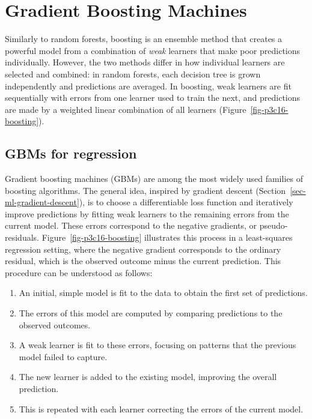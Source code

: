 \documentclass[
  letterpaper,
  krantz2]{style/krantz}
\providecommand{\tightlist}{%
  \setlength{\itemsep}{0pt}\setlength{\parskip}{0pt}}
\begin{document}
\chapter{Gradient Boosting Machines}\label{sec-boost}

Similarly to random forests, boosting is an
ensemble method that creates a powerful model from a combination of
\emph{weak} learners that make poor predictions
individually.
However, the two methods differ in how individual learners are selected
and combined: in random forests, each decision tree is grown
independently and predictions are averaged. In boosting, weak learners
are fit sequentially with errors from one learner used to train the
next, and predictions are made by a weighted linear combination of all
learners (Figure~\ref{fig-p3c16-boosting}).

\section{GBMs for regression}\label{sec-surv-ml-models-boost-regr}

Gradient boosting machines (GBMs) are among the most widely used
families of boosting algorithms. The general idea, inspired by gradient
descent (Section~\ref{sec-ml-gradient-descent}), is to choose a
differentiable loss function and iteratively improve predictions by
fitting weak learners to the remaining errors from the current model.
These errors correspond to the negative gradients, or
pseudo-residuals.
Figure~\ref{fig-p3c16-boosting} illustrates this process in a
least-squares regression setting, where the negative gradient
corresponds to the ordinary residual, which is the observed outcome
minus the current prediction. This procedure can
be understood as follows:

\begin{enumerate}
\def\labelenumi{\arabic{enumi}.}
\tightlist
\item
  An initial, simple model is fit to the data to obtain the first set of
  predictions.
\item
  The errors of this model are computed by comparing predictions to the
  observed outcomes.
\item
  A weak learner is fit to these errors, focusing on patterns that the
  previous model failed to capture.
\item
  The new learner is added to the existing model, improving the overall
  prediction.
\item
  This is repeated with each learner correcting the errors of the
  current model.
\end{enumerate}
\end{document}
